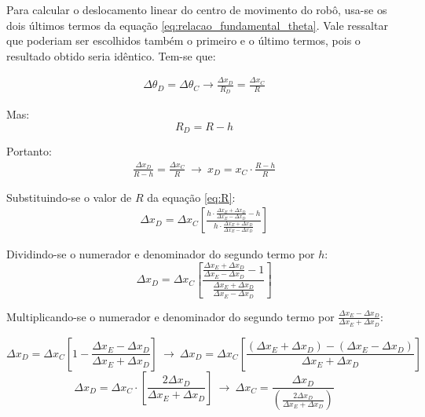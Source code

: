 Para calcular o deslocamento linear do centro de movimento do robô, usa-se os dois últimos termos da equação \ref{eq:relacao_fundamental_theta}. Vale ressaltar que poderiam ser escolhidos também o primeiro e o último termos, pois o resultado obtido seria idêntico. Tem-se que:

\begin{eqnarray*}
  \Delta \theta_D = \Delta \theta_C \rightarrow \frac{\Delta x_D}{R_D} = \frac{\Delta x_C}{R} 
\end{eqnarray*}

Mas:
\begin{equation*}
  R_D = R - h
\end{equation*}

Portanto:
\begin{eqnarray*}
  \frac{\Delta x_D}{R - h} = \frac{\Delta x_C}{R} ~\rightarrow~ x_D = x_C \cdot \frac{R - h}{R} 
\end{eqnarray*}

Substituindo-se o valor de $R$ da equação \ref{eq:R}:
\begin{eqnarray*}
  \Delta x_D = \Delta x_C \left[ \frac{h \cdot \frac{\Delta x_E + \Delta x_D}{\Delta x_E - \Delta x_D} - h}{h \cdot \frac{\Delta x_E + \Delta x_D}{\Delta x_E - \Delta x_D}} \right]
\end{eqnarray*}

Dividindo-se o numerador e denominador do segundo termo por $h$:
\begin{equation*}
  \Delta x_D = \Delta x_C \left[ \frac{\frac{\Delta x_E + \Delta x_D}{\Delta x_E - \Delta x_D} - 1}{\frac{\Delta x_E + \Delta x_D}{\Delta x_E - \Delta x_D}} \right]
\end{equation*}

Multiplicando-se o numerador e denominador do segundo termo por $\frac{\Delta x_E - \Delta x_D}{\Delta x_E + \Delta x_D}$:

\begin{equation*}
  \Delta x_D = \Delta x_C \left[1 - \frac{\Delta x_E - \Delta x_D}{\Delta x_E + \Delta x_D} \right] ~\rightarrow~
  \Delta x_D = \Delta x_C \left[\frac{(\Delta x_E + \Delta x_D) - (\Delta x_E - \Delta x_D)}{\Delta x_E + \Delta x_D} \right] 
\end{equation*}
\begin{equation*}
  \Delta x_D = \Delta x_C \cdot \left[ \frac{2 \Delta x_D}{\Delta x_E + \Delta x_D} \right] ~\rightarrow~
  \Delta x_C = \frac{\Delta x_D}{\left(\frac{2 \Delta x_D}{\Delta x_E + \Delta x_D} \right)}
\end{equation*}


